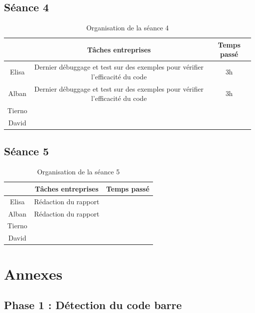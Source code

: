 \documentclass{rapport}
\begin{document}
\subsection{Séance 4}

\begin{table}[H]
	\centering 
	\begin{tabular}{c|c|c}
		& Tâches entreprises& Temps passé\\ \hline
		Elisa& Dernier débuggage et test sur des exemples pour vérifier l'efficacité du code& 3h\\ \hline
		Alban& Dernier débuggage et test sur des exemples pour vérifier l'efficacité du code& 3h\\ \hline
		Tierno& & \\ \hline
		David& & 
	\end{tabular}
	\caption{Organisation de la séance 4}
\end{table}

\subsection{Séance 5} %

\begin{table}[H]
	\centering 
	\begin{tabular}{c|c|c}
		& Tâches entreprises& Temps passé\\ \hline
		Elisa& Rédaction du rapport & \\ \hline
		Alban& Rédaction du rapport & \\ \hline
		Tierno& & \\ \hline
		David& & 
	\end{tabular}
	\caption{Organisation de la séance 5}
\end{table}

\newpage

\section{Annexes}

\lstset{style=mystyle}

\subsection{Phase 1 : Détection du code barre}
\end{document}
